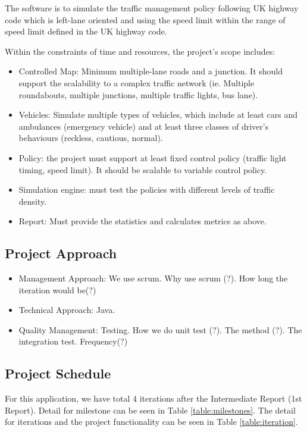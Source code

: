 \documentclass[11pt]{article}
\begin{document}
The software is to simulate the traffic management policy following UK highway code which is left-lane oriented and using the speed limit within the range of speed limit defined in the UK highway code.


Within the constraints of time and resources, the project’s scope includes:
\begin{itemize}
\item Controlled Map: Minimum multiple-lane roads and a junction. It should support the scalability to a complex traffic network (ie. Multiple roundabouts, multiple junctions, multiple traffic lights, bus lane).
\item Vehicles: Simulate multiple types of vehicles, which include at least cars and ambulances (emergency vehicle) and at least three classes of driver’s behaviours (reckless, cautious, normal).
\item Policy: the project must support at least fixed control policy (traffic light timing, speed limit). It should be scalable to variable control policy.
\item Simulation engine: must test the policies with different levels of traffic density.
\item Report: Must provide the statistics and calculates metrics as above.
\end{itemize}


\subsection{Project Approach}
\begin{itemize}
	\item Management Approach: We use scrum. Why use scrum (?). How long the iteration would be(?)
	\item Technical Approach: Java. 
	\item Quality Management: Testing. How we do unit test (?). The method (?). The integration test. Frequency(?)
\end{itemize}
\subsection{Project Schedule}

 For this application, we have total 4 iterations after the Intermediate Report (1st Report). Detail for milestone can be seen in Table \ref{table:milestones}. The detail for iterations and the project functionality can be seen in Table \ref{table:iteration}.
 
\end{document}

